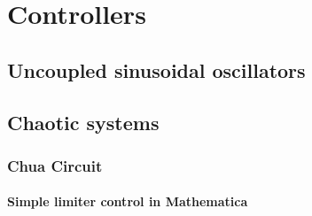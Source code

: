 \documentclass[main]{subfiles}
\begin{document}
\setcounter{chapter}{2}

\chapter{Controllers} %

\label{Chapter\thechapter} %


\section{Uncoupled sinusoidal oscillators}

\lipsum[1]

\section{Chaotic systems}

\lipsum[2]

\subsection{Chua Circuit}

\lipsum[3]

\subsubsection{Simple limiter control in Mathematica}

\lipsum[4]

\end{document}

